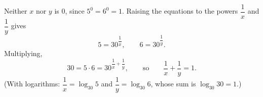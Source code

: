 Neither $x$ nor $y$ is $0$, since $5^0=6^0=1$. Raising the equations to the powers $\dfrac{1}{x}$ and $\dfrac{1}{y}$ gives
\[5=30^{\dfrac{1}{x}},\qquad 6=30^{\dfrac{1}{y}}.\]
Multiplying,
\[30=5\cdot6=30^{\dfrac{1}{x}+\dfrac{1}{y}},\qquad\text{so}\qquad\dfrac{1}{x}+\dfrac{1}{y}=\boxed{1}.\]
(With logarithms: $\dfrac{1}{x}=\log_{30}5$ and $\dfrac{1}{y}=\log_{30}6$, whose sum is $\log_{30}30=1$.)
